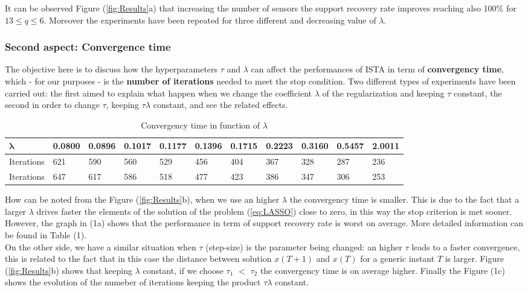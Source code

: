 It can be observed Figure (\ref{fig:Results}a) that increasing the number of sensors the support recovery rate improves reaching also 100\% for $13\le q \le6$. Moreover the experiments have been repeated for three different and decreasing value of $\lambda$. 

\subsubsection*{Second aspect: Convergence time}

The objective here is to discuss how the hyperparameters $\tau$ and $\lambda$ can affect the performances of ISTA in term of \textbf{convergency time}, which - for our purposes - is the \textbf{number of iterations} needed to meet the stop condition. Two different types of experiments have been carried out: the first aimed to explain what happen when we change the coefficient $\lambda$ of the regularization and keeping $\tau$ constant, the second in order to change $\tau$, keeping $\tau\lambda$ constant, and see the related effects.\\
\vspace{-0.4cm}
\begin{table}[h] \label{table:1}
    \centering
    \begin{tabular}{| p{2cm} || p{1cm} |p{1cm} |p{1cm} |p{1cm} |p{1cm} |p{1cm} |p{1cm} |p{1cm} |p{1cm} |p{1cm} | }
        \hline
        $\boldsymbol{\lambda}$&0.0800&0.0896&0.1017&0.1177&0.1396&0.1715&0.2223&0.3160&0.5457&2.0011\\
        \hline
        {\color{blue}Iterations}  &621&590&560&529&456&404&367&328&287&236\\
        \hline
        {\color{red}Iterations}  &647&617&586&518&477&423&386&347&306&253\\
        \hline    
    \end{tabular}
    \caption{Convergency time in function of $\lambda$}
    \vspace{-0.3cm}
\end{table}

\noindent
How can be noted from the Figure (\ref{fig:Results}b), when we use an higher $\lambda$ the convergency time is smaller. This is due to the fact that a larger $\lambda$ drives faster the elements of the solution of the problem (\ref{eq:LASSO}) close to zero, in this way the stop criterion is met sooner. However, the graph in (1a) shows that the performance in term of support recovery rate is worst on average. More detailed information can be found in Table (1).\\
On the other side, we have a similar situation when $\tau$ (step-size) is the parameter being changed: an higher $\tau$ leads to a faster convergence, this is related to the fact that in this case the distance between solution $x(T+1)$ and $x(T)$ for a generic instant $T$ is larger. Figure (\ref{fig:Results}b) shows that keeping $\lambda$ constant, if we choose  {{\color{red}$\tau_1$} $<$ {\color{blue}$\tau_2$}} the convergency time is on average higher. Finally the Figure (1c) shows the evolution of the numeber of iterations keeping the product $\tau\lambda$ constant.



